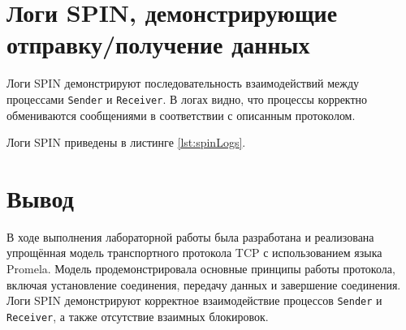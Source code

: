 \documentclass{bmstu}
\begin{document}

\section{Логи SPIN, демонстрирующие отправку/получение данных}

Логи SPIN демонстрируют последовательность взаимодействий между процессами \texttt{Sender} и \texttt{Receiver}. В логах видно, что процессы корректно обмениваются сообщениями в соответствии с описанным протоколом.

Логи SPIN приведены в листинге \ref{lst:spinLogs}.


\section{Вывод}

В ходе выполнения лабораторной работы была разработана и реализована упрощённая модель транспортного протокола TCP с использованием языка Promela. Модель продемонстрировала основные принципы работы протокола, включая установление соединения, передачу данных и завершение соединения. Логи SPIN демонстрируют корректное взаимодействие процессов \texttt{Sender} и \texttt{Receiver}, а также отсутствие взаимных блокировок.
\end{document}

